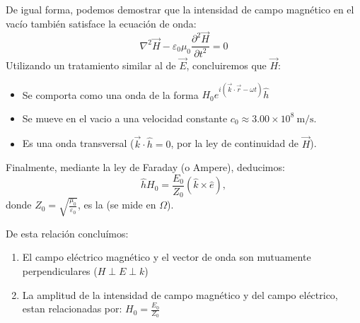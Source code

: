 \documentclass[letterpaper,10pt,english]{jupyterBook}
\begin{document}
\sphinxAtStartPar
De igual forma, podemos demostrar que la intensidad de campo magnético en el vacío también satisface la ecuación de onda:
\begin{equation*}
\nabla^2\vec{H} - \varepsilon_0\mu_0\frac{\partial^2\vec{H}}{\partial t^2} = 0
\end{equation*}
\sphinxAtStartPar
Utilizando un tratamiento similar al de \(\vec{E}\), concluiremos que \(\vec{H}\):
\begin{itemize}
\item {} 
\sphinxAtStartPar
Se comporta como una onda de la forma \(H_0 e^{ i\left(\vec{k}\cdot\vec{r} - \omega t\right)} \hat{h}\)

\item {} 
\sphinxAtStartPar
Se mueve en el vacio a una velocidad constante \(c_0 \approx 3.00\times10^8~\mathrm{m/s}\).

\item {} 
\sphinxAtStartPar
Es una onda transversal (\(\vec{k}\cdot\hat{h} = 0\), por la ley de continuidad de \(\vec{H}\)).

\end{itemize}

\sphinxAtStartPar
Finalmente, mediante la ley de Faraday (o Ampere), deducimos:
\begin{equation*}
\hat{h}{H}_0 = \frac{E_0}{Z_0}\left(\hat{k}\times\hat{e}\right),
\end{equation*}
\sphinxAtStartPar
donde \(Z_0 = \sqrt{\frac{\mu_0}{\varepsilon_0}}\), es la  (se mide en \(\Omega\)).

\sphinxAtStartPar
De esta relación concluímos:
\begin{enumerate}
%
\item {} 
\sphinxAtStartPar
El campo eléctrico magnético y el vector de onda son mutuamente perpendiculares (\(H\perp E\perp k\))

\item {} 
\sphinxAtStartPar
La amplitud de la intensidad de campo magnético y del campo eléctrico, estan relacionadas por: \({H}_0 = \frac{E_0}{Z_0}\)

\end{enumerate}
\end{document}
